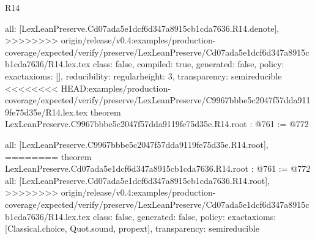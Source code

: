 \begin{lexlean}{R14}
\begin{coremodule}
{{{{{{{{{{{{  all: [LexLeanPreserve.Cd07ada5e1dcf6d347a8915cb1cda7636.R14.denote],
>>>>>>>> origin/release/v0.4:examples/production-coverage/expected/verify/preserve/LexLeanPreserve/Cd07ada5e1dcf6d347a8915cb1cda7636/R14.lex.tex
  class: false,
  compiled: true,
  generated: false,
  policy: exact{axioms: []},
  reducibility: regular{height: 3},
  transparency: semireducible
}
<<<<<<<< HEAD:examples/production-coverage/expected/verify/preserve/LexLeanPreserve/C9967bbbe5c2047f57dda9119fe75d35e/R14.lex.tex
theorem LexLeanPreserve.C9967bbbe5c2047f57dda9119fe75d35e.R14.root : @761 := @772 {
  all: [LexLeanPreserve.C9967bbbe5c2047f57dda9119fe75d35e.R14.root],
========
theorem LexLeanPreserve.Cd07ada5e1dcf6d347a8915cb1cda7636.R14.root : @761 := @772 {
  all: [LexLeanPreserve.Cd07ada5e1dcf6d347a8915cb1cda7636.R14.root],
>>>>>>>> origin/release/v0.4:examples/production-coverage/expected/verify/preserve/LexLeanPreserve/Cd07ada5e1dcf6d347a8915cb1cda7636/R14.lex.tex
  class: false,
  generated: false,
  policy: exact{axioms: [Classical.choice, Quot.sound, propext]},
  transparency: semireducible
}

}}}}}}}}}}}}
\end{coremodule}
\end{lexlean}
